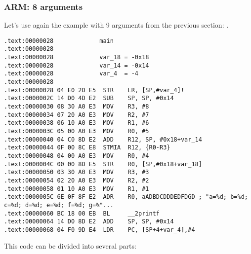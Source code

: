 \subsubsection{ARM: 8 arguments}

Let's use again the example with 9 arguments from the previous section: .



\myparagraph{\OptimizingKeilVI: \ARMMode}

\begin{lstlisting}[style=customasmARM]
.text:00000028             main
.text:00000028
.text:00000028             var_18 = -0x18
.text:00000028             var_14 = -0x14
.text:00000028             var_4  = -4
.text:00000028
.text:00000028 04 E0 2D E5  STR    LR, [SP,#var_4]!
.text:0000002C 14 D0 4D E2  SUB    SP, SP, #0x14
.text:00000030 08 30 A0 E3  MOV    R3, #8
.text:00000034 07 20 A0 E3  MOV    R2, #7
.text:00000038 06 10 A0 E3  MOV    R1, #6
.text:0000003C 05 00 A0 E3  MOV    R0, #5
.text:00000040 04 C0 8D E2  ADD    R12, SP, #0x18+var_14
.text:00000044 0F 00 8C E8  STMIA  R12, {R0-R3}
.text:00000048 04 00 A0 E3  MOV    R0, #4
.text:0000004C 00 00 8D E5  STR    R0, [SP,#0x18+var_18]
.text:00000050 03 30 A0 E3  MOV    R3, #3
.text:00000054 02 20 A0 E3  MOV    R2, #2
.text:00000058 01 10 A0 E3  MOV    R1, #1
.text:0000005C 6E 0F 8F E2  ADR    R0, aADBDCDDDEDFDGD ; "a=%d; b=%d; c=%d; d=%d; e=%d; f=%d; g=%"...
.text:00000060 BC 18 00 EB  BL     __2printf
.text:00000064 14 D0 8D E2  ADD    SP, SP, #0x14
.text:00000068 04 F0 9D E4  LDR    PC, [SP+4+var_4],#4
\end{lstlisting}

This code can be divided into several parts:

